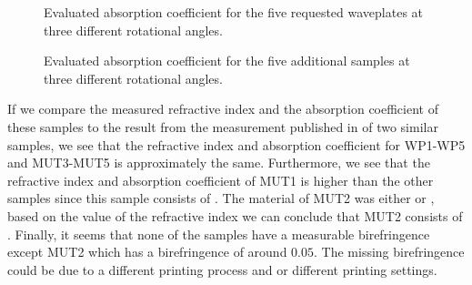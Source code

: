 \begin{figure}[H]
\centering
\subcaptionbox{\label{fig:ceramic_WP1_abs}}
    {\hspace*{-2em}}
\qquad
\subcaptionbox{\label{fig:ceramic_WP2_abs}}
    {\hspace*{-2em}}
\subcaptionbox{\label{fig:ceramic_WP3_abs}}
    {\hspace*{-2em}}
\qquad
\subcaptionbox{\label{fig:ceramic_WP4_abs}}
    {\hspace*{-2em}}
\subcaptionbox{\label{fig:ceramic_WP5_abs}}
    {}
\caption{Evaluated absorption coefficient for the five requested waveplates at three different rotational angles.}
\label{fig:ceramic_WPs_abs}
\end{figure}

\begin{figure}[H]
\centering
\subcaptionbox{\label{fig:ceramic_MUT1_abs}}
    {\hspace*{-2em}}
\qquad
\subcaptionbox{\label{fig:ceramic_MUT2_abs}}
    {\hspace*{-2em}}
\subcaptionbox{\label{fig:ceramic_MUT3_abs}}
    {\hspace*{-2em}}
\qquad
\subcaptionbox{\label{fig:ceramic_MUT4_abs}}
    {\hspace*{-2em}}
\subcaptionbox{\label{fig:ceramic_MUT5_abs}}
    {}
\caption{Evaluated absorption coefficient for the five additional samples at three different rotational angles.}
\label{fig:ceramic_MUTs_abs}
\end{figure}

If we compare the measured refractive index and the absorption coefficient of these  samples to the result from the measurement published in \cite{Ornik2018} of two similar  samples, we see that the refractive index and absorption coefficient for WP1-WP5 and MUT3-MUT5 is approximately the same. Furthermore, we see that the refractive index and absorption coefficient of MUT1 is higher than the other samples since this sample consists of . The material of MUT2 was either  or , based on the value of the refractive index we can conclude that MUT2 consists of . Finally, it seems that none of the samples have a measurable birefringence except MUT2 which has a birefringence of around $0.05$. The missing birefringence could be due to a different printing process and or different printing settings.

